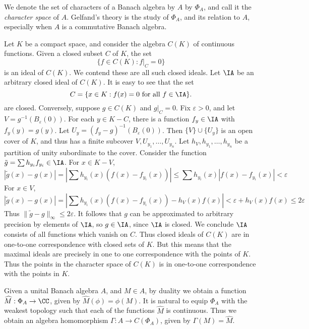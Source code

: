 We denote the set of characters of a Banach algebra by $A$ by $\Phi_A$, and call it the \emph{character space} of $A$. Gelfand's theory is the study of $\Phi_A$, and its relation to $A$, especially when $A$ is a commutative Banach algebra.

\begin{example}
    Let $K$ be a compact space, and consider the algebra $C(K)$ of continuous functions. Given a closed subset $C$ of $K$, the set
    \[ \{ f \in C(K) : f|_C = 0 \} \]
    is an ideal of $C(K)$. We contend these are all such closed ideals. Let $\IA$ be an arbitrary closed ideal of $C(K)$. It is easy to see that the set
    \[ C = \{ x \in K : f(x) = 0\ \text{for all $f \in \IA$} \}. \]
    are closed. Conversely, suppose $g \in C(K)$ and $g|_C = 0$. Fix $\varepsilon > 0$, and let $V = g^{-1}(B_\varepsilon(0))$. For each $y \in K - C$, there is a function $f_y \in \IA$ with $f_y(y) = g(y)$. Let $U_y = (f_y - g)^{-1}(B_\varepsilon(0))$. Then $\{ V \} \cup \{ U_y \}$ is an open cover of $K$, and thus has a finite subcover $V, U_{y_1}, \dots, U_{y_n}$. Let $h_V, h_{y_1}, \dots, h_{y_n}$ be a partition of unity subordinate to the cover. Consider the function $\tilde{g} = \sum h_{y_i} f_{y_i} \in \IA$. For $x \in K - V$,
    \[ |\tilde{g}(x) - g(x)| = | \sum h_{y_i}(x) (f(x) - f_{y_i}(x)) | \leq \sum h_{y_i}(x) |f(x) - f_{y_i}(x)| < \varepsilon \]
    For $x \in V$,
    \[ |\tilde{g}(x) - g(x)| = | \sum h_{y_i}(x) (f(x) - f_{y_i}(x)) - h_V(x) f(x) | < \varepsilon + h_V(x) f(x) \leq 2 \varepsilon \]
    Thus $\| \tilde{g} - g \|_\infty \leq 2 \varepsilon$. It follows that $g$ can be approximated to arbitrary precision by elements of $\IA$, so $g \in \IA$, since $\IA$ is closed. We conclude $\IA$ consists of all functions which vanish on $C$. Thus closed ideals of $C(K)$ are in one-to-one correspondence with closed sets of $K$. But this means that the maximal ideals are precisely in one to one correspondence with the points of $K$. Thus the points in the character space of $C(K)$ is in one-to-one correspondence with the points in $K$.
\end{example}

Given a unital Banach algebra $A$, and $M \in A$, by duality we obtain a function $\widehat{M}: \Phi_A \to \CC$, given by $\widehat{M}(\phi) = \phi(M)$. It is natural to equip $\Phi_A$ with the weakest topology such that each of the functions $\widehat{M}$ is continuous. Thus we obtain an algebra homomorphism $\Gamma: A \to C(\Phi_A)$, given by $\Gamma(M) = \widehat{M}$.

